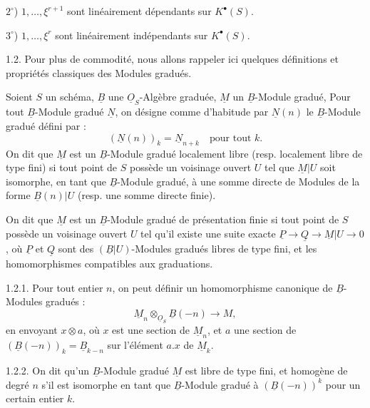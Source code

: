 
\(2^\circ\)) \(1,\ldots,\xi^{r+1}\)
sont linéairement dépendants sur \(K^{\bullet}(S)\).

\(3^\circ\)) \(1,\ldots,\xi^r\) sont linéairement indépendants sur \(K^{\bullet}(S)\).

1.2.
Pour plus de commodité, nous allons rappeler ici quelques définitions et propriétés classiques des Modules gradués.

Soient \(S\) un schéma, \(\underline{B}\) une \(\underline{O}_S\)-Algèbre graduée, \(\underline{M}\) un \(\underline{B}\)-Module gradué, Pour tout \(\underline{B}\)-Module gradué \(\underline{N}\), on désigne comme d'habitude par \(\underline{N}(n)\) le \(\underline{B}\)-Module gradué défini par :
\[
  (\underline{N}(n))_k=\underline{N}_{n+k}\quad\text{pour tout }k.
\]
On dit que \(\underline{M}\) est un \(\underline{B}\)-Module gradué localement libre (resp. localement libre de type fini) si tout point de \(S\) possède un voisinage ouvert \(U\) tel que \(\underline{M}|U\) soit isomorphe, en tant que \(\underline{B}\)-Module gradué, à une somme directe de Modules de la forme \(\underline{B}(n)|U\) (resp. une somme directe finie).

On dit que \(\underline{M}\) est un \(\underline{B}\)-Module gradué de présentation finie si tout point de \(S\) possède un voisinage ouvert \(U\) tel qu'il existe une suite exacte \(\underline{P}\longrightarrow \underline{Q}\longrightarrow \underline{M}|U\longrightarrow 0\), où \(\underline{P}\) et \(\underline{Q}\) sont des \((\underline{B}|U)\)-Modules gradués libres de type fini, et les homomorphismes compatibles aux graduations.

1.2.1. Pour tout entier \(n\), on peut définir un homomorphisme canonique de \(\underline{B}\)-Modules gradués :
\begin{equation}\tag{1.2.1}
  \underline{M}_n\otimes_{\underline{O}_S} \underline{B}(-n)\longrightarrow M,
\end{equation}
en envoyant \(x\otimes a\), où \(x\) est une section de \(\underline{M}_n\), et \(a\) une section de \((\underline{B}(-n))_k=\underline{B}_{k-n}\) sur l'élément \(a.x\) de \(\underline{M}_k\).

1.2.2. On dit qu'un \(\underline{B}\)-Module gradué \(\underline{M}\) est libre de type fini, et homogène de degré \(n\) s'il est isomorphe en tant que \(\underline{B}\)-Module gradué à \((\underline{B}(-n))^k\) pour un certain entier \(k\).

